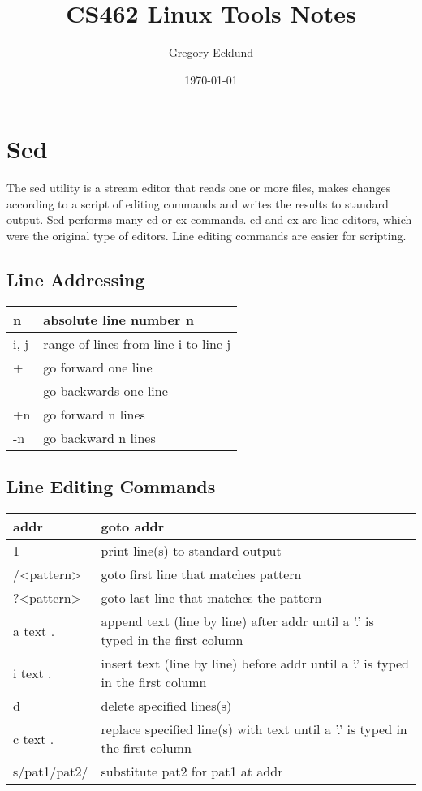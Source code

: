 \documentclass[12pt]{article}
\title{CS462 Linux Tools Notes}
\author{Gregory Ecklund}
\date{\today}
\begin{document}
    \maketitle

    \tableofcontents
    \newpage

    \section{Sed}
    The sed utility is a stream editor that reads one or more files, makes changes 
    according to a script of editing commands and writes the results to standard output. 
    Sed performs many ed or ex commands. ed and ex are line editors, which were the original 
    type of editors. Line editing commands are easier for scripting.

    \subsection{Line Addressing}
    \begin{tabular}{|l|l|}
        \hline
        n & absolute line number n \\
        \hline
        i, j & range of lines from line i to line j \\
        \hline
        + & go forward one line \\
        \hline
        - & go backwards one line \\
        \hline
        +n & go forward n lines \\
        \hline
        -n & go backward n lines \\
        \hline
    \end{tabular}

    \subsection{Line Editing Commands}
    \begin{tabular}{|l|l|}
        \hline
        addr & goto addr \\
        \hline
        [addr] 1 & print line(s) to standard output \\
        \hline
        /<pattern> & goto first line that matches pattern \\
        \hline
        ?<pattern> & goto last line that matches the pattern \\
        \hline
        [addr] a text . & append text (line by line) after addr until a '.' is typed in the first column \\
        \hline
        [addr] i text . & insert text (line by line) before addr until a '.' is typed in the first column \\
        \hline
        [addr] d & delete specified lines(s) \\
        \hline
        [addr] c text . & replace specified line(s) with text until a '.' is typed in the first column \\
        \hline
        [addr] s/pat1/pat2/ & substitute pat2 for pat1 at addr \\
        \hline
    \end{tabular}
\end{document}
